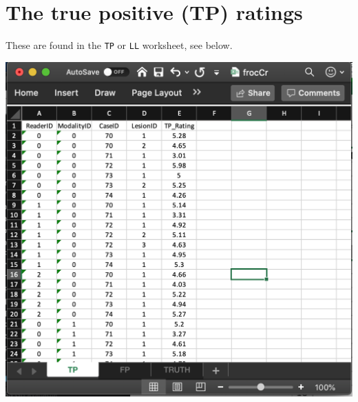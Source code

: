 \documentclass[
]{book}
\begin{document}
\hypertarget{quick-start-froc-data-tp}{%
\section{The true positive (TP) ratings}\label{quick-start-froc-data-tp}}

These are found in the \texttt{TP} or \texttt{LL} worksheet, see below.

\includegraphics[width=1\textwidth,height=\textheight]{images/quick-start/frocCrLL.png}
\end{document}
